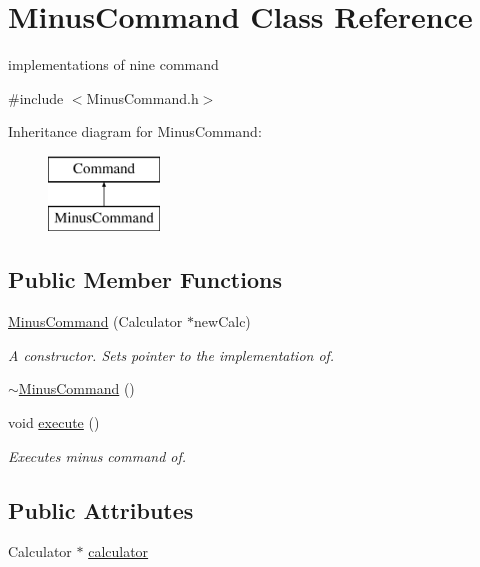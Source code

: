 \hypertarget{class_minus_command}{}\section{Minus\+Command Class Reference}
\label{class_minus_command}


implementations of nine command  




{\ttfamily \#include $<$Minus\+Command.\+h$>$}

Inheritance diagram for Minus\+Command\+:\begin{figure}[H]
\begin{center}
\leavevmode
\includegraphics[height=2.000000cm]{class_minus_command}
\end{center}
\end{figure}
\subsection*{Public Member Functions}
\begin{DoxyCompactItemize}
\item 
\hyperlink{class_minus_command_a9304469f5f5baa79902bd21e81fb3526}{Minus\+Command} (Calculator $\ast$new\+Calc)
\begin{DoxyCompactList}\small\item\em A constructor. Sets pointer to the implementation of. \end{DoxyCompactList}\item 
\hyperlink{class_minus_command_a0e00ddd659bb8bbc71e2e87d060b63c7}{$\sim$\+Minus\+Command} ()
\item 
void \hyperlink{class_minus_command_a117f4a7fb5f380d968e057ee9efad956}{execute} ()
\begin{DoxyCompactList}\small\item\em Executes minus command of. \end{DoxyCompactList}\end{DoxyCompactItemize}
\subsection*{Public Attributes}
\begin{DoxyCompactItemize}
\item 
Calculator $\ast$ \hyperlink{class_minus_command_a659a458964a22955e73022f23c8a2f7e}{calculator}
\end{DoxyCompactItemize}


